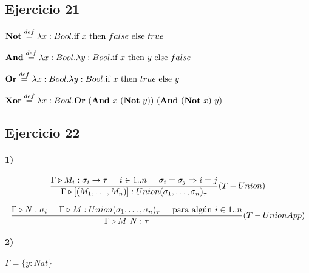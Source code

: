 \documentclass[10pt,a4paper, landscape]{article}
\begin{document}
\subsection{Ejercicio 21}
\begin{multicols}{2}
$\textbf{Not} \overset{def}{=} \lambda x: Bool \text{.} \text{if } x \text{ then } false \text{ else } true$

\vspace*{5mm}
$\textbf{And} \overset{def}{=} \lambda x: Bool \text{.} \lambda y: Bool \text{.} \text{if } x \text{ then } y \text{ else } false$

\vfill

$\textbf{Or} \overset{def}{=} \lambda x: Bool \text{.} \lambda y: Bool \text{.} \text{if } x \text{ then } true \text{ else } y$

\vspace*{5mm}
$\textbf{Xor} \overset{def}{=} \lambda x: Bool \text{.} \textbf{Or}~(\textbf{And}~x~(\textbf{Not}~y))~(\textbf{And}~(\textbf{Not}~x)~y)$
\end{multicols}

\newpage
\subsection*{Ejercicio 22}
\paragraph{1)}

\begin{multicols}{2}
$$\frac{\Gamma\triangleright M_i : \sigma_i\to\tau\hspace*{5mm}i\in1..n\hspace*{5mm}\sigma_i=\sigma_j\Rightarrow i =j }{\Gamma\triangleright [(M_1,\dots,M_n)] : Union(\sigma_1,\dots,\sigma_n)_\tau}(T-Union)$$

\vspace*{5mm}
$$\frac{\Gamma\triangleright N : \sigma_i\hspace*{5mm}\Gamma\triangleright M : Union(\sigma_1,\dots,\sigma_n)_\tau\hspace*{5mm}\text{para algún }  i\in1..n }{\Gamma\triangleright M~N : \tau}(T-UnionApp)$$
\end{multicols}

\paragraph{2)} $\Gamma = \{y: Nat\}$
\end{document}
